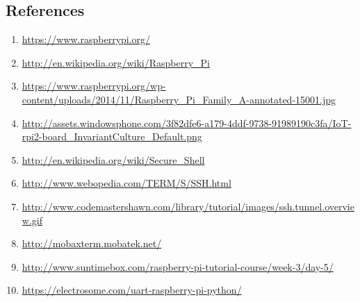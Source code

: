\documentclass[11pt,a4paper]{report}
\begin{document}
\begin{flushleft}
	
		\newpage
	\chapter{References}
		\begin{enumerate}
		\item \url{https://www.raspberrypi.org/}
		\item \url{http://en.wikipedia.org/wiki/Raspberry_Pi}	
		\item \url{https://www.raspberrypi.org/wp-content/uploads/2014/11/Raspberry_Pi_Family_A-annotated-15001.jpg}
		\item \url{http://assets.windowsphone.com/3f82dfe6-a179-4ddf-9738-91989190c3fa/IoT-rpi2-board_InvariantCulture_Default.png}	
		\item \url{http://en.wikipedia.org/wiki/Secure_Shell}
		\item \url{http://www.webopedia.com/TERM/S/SSH.html}
		\item \url{http://www.codemastershawn.com/library/tutorial/images/ssh.tunnel.overview.gif}
		\item \url{http://mobaxterm.mobatek.net/}
		\item \url{http://www.suntimebox.com/raspberry-pi-tutorial-course/week-3/day-5/}
		\item \url{https://electrosome.com/uart-raspberry-pi-python/}
	\end{enumerate}
	
	
\end{flushleft}
\end{document}
